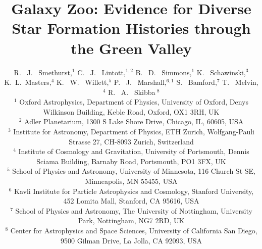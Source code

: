 \documentclass[useAMS,usenatbib]{mn2e}
\begin{document}
\title[The Star Formation History of the Green Valley]{Galaxy Zoo: Evidence for Diverse Star Formation Histories through the Green Valley}
\author[Smethurst et al. 2014]{R. ~J. ~Smethurst,$^1$ C. ~J. ~Lintott,$^{1,2}$ B. ~D. ~Simmons,$^{1}$ K. ~Schawinski,$^{3}$ \newauthor K.~L.~Masters,$^{4}$ K. ~W. ~Willett,$^{5}$ P. ~J. ~Marshall,$^{6,1}$ S. ~Bamford,$^{7}$ T. ~Melvin,$^{4}$ \newauthor R. ~A. ~Skibba$~^{8}$
\\ $^1$ Oxford Astrophysics, Department of Physics, University of Oxford, Denys Wilkinson Building, Keble Road, Oxford, OX1 3RH, UK 
\\ $^2$ Adler Planetarium, 1300 S Lake Shore Drive, Chicago, IL, 60605, USA 
\\ $^3$ Institute for Astronomy, Department of Physics, ETH Zurich, Wolfgang-Pauli Strasse 27, CH-8093 Zurich, Switzerland 
\\ $^4$ Institute of Cosmology and Gravitation, University of Portsmouth, Dennis Sciama Building, Barnaby Road, Portsmouth, PO1 3FX, UK 
\\ $^5$ School of Physics and Astronomy, University of Minnesota, 116 Church St SE, Minneapolis, MN 55455, USA
\\ $^6$ Kavli Institute for Particle Astrophysics and Cosmology, Stanford University, 452 Lomita Mall, Stanford, CA 95616, USA
\\ $^7$ School of Physics and Astronomy, The University of Nottingham, University Park, Nottingham, NG7 2RD, UK
\\ $^8$ Center for Astrophysics and Space Sciences, University of California San Diego, 9500 Gilman Drive, La Jolla, CA 92093, USA}

\maketitle
\end{document}
